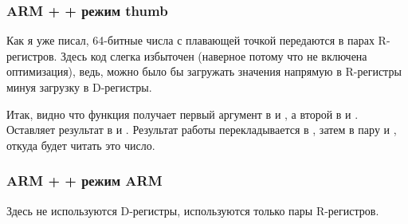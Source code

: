 ﻿\subsubsection{ARM + \NonOptimizingXcode + режим thumb}



Как я уже писал, 64-битные числа с плавающей точкой передаются в парах R-регистров.
Здесь код слегка избыточен (наверное потому что не включена оптимизация), ведь, можно было бы 
загружать значения напрямую в R-регистры минуя загрузку в D-регистры.

Итак, видно что функция  получает первый аргумент в  и , а второй в  и . 
Оставляет результат в  и .
Результат работы  перекладывается в , затем в пару  и , 
откуда \printf будет читать это число.

\subsubsection{ARM + \NonOptimizingKeil + режим ARM}



Здесь не используются D-регистры, используются только пары R-регистров.

